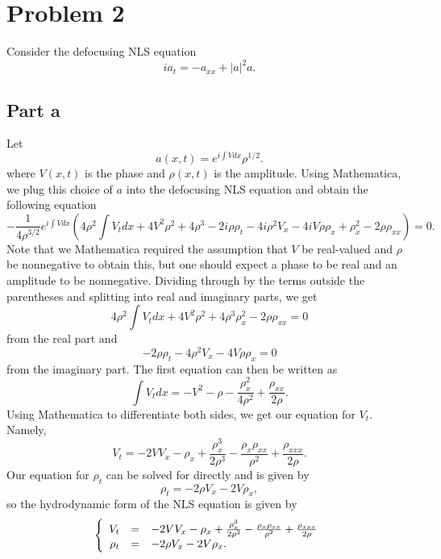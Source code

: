 \documentclass{article}
\begin{document}
\section{Problem 2}
Consider the defocusing NLS equation
\[
i a_t=-a_{xx}+|a|^2 a.
\]
\subsection{Part a}
Let
\[
a(x,t)=e^{i \int Vdx} \rho^{1/2}.
\]
where $V(x,t)$ is the phase and $\rho(x,t)$ is the amplitude. Using Mathematica, we plug this choice of $a$ into the defocusing NLS equation and obtain the following equation
\[
-\frac{1}{4\rho^{3/2}}e^{i \int Vdx}\left(4\rho^2\int V_tdx+4V^2\rho^2+4\rho^3-2i\rho\rho_t-4i\rho^2V_x-4iV\rho\rho_x+\rho_x^2-2\rho\rho_{xx}\right)=0.
\]
Note that we Mathematica required the assumption that $V$ be real-valued and $\rho$ be nonnegative to obtain this, but one should expect a phase to be real and an amplitude to be nonnegative.
Dividing through by the terms outside the parentheses and splitting into real and imaginary parts, we get 
\[
4\rho^2\int V_tdx+4V^2\rho^2+4\rho^3\rho_x^2-2\rho\rho_{xx}=0
\]
from the real part and 
\[
-2\rho\rho_t-4\rho^2V_x-4V\rho\rho_x=0
\]
from the imaginary part. The first equation can then be written as
\[
\int V_tdx=-V^2-\rho-\frac{\rho_x^2}{4\rho^2}+\frac{\rho_{xx}}{2\rho}.
\]
Using Mathematica to differentiate both sides, we get our equation for $V_t$. Namely,
\[
V_t=-2VV_x-\rho_x+\frac{\rho_x^3}{2\rho^3}-\frac{\rho_x\rho_{xx}}{\rho^2}+\frac{\rho_{xxx}}{2\rho}.
\]
Our equation for $\rho_t$ can be solved for directly and is given by
\[
\rho_t=-2\rho V_x-2V\rho_x, 
\]
so the hydrodynamic form of the NLS equation is given by
\[
\left\{\begin{array}{rcl}
	\displaystyle V_t&=&-2VV_x-\rho_x+\frac{\rho_x^3}{2\rho^3}-\frac{\rho_x\rho_{xx}}{\rho^2}+\frac{\rho_{xxx}}{2\rho}\\
	\displaystyle \rho_t&=&\displaystyle -2\rho V_x-2V\rho_x.
\end{array}\right.
\]
\end{document}
